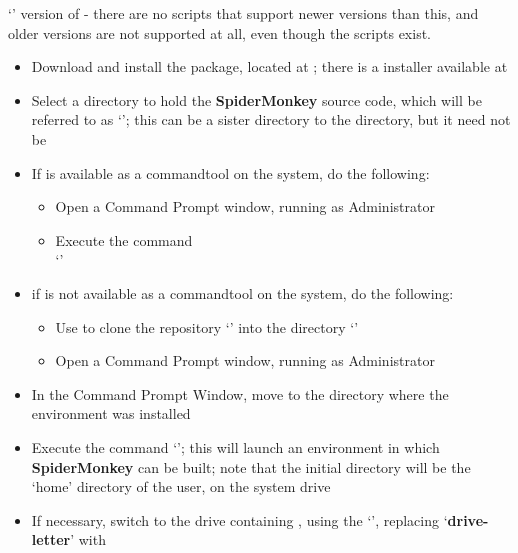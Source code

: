 `' version of  - there are
no scripts that support newer versions than this, and older versions are not supported at
all, even though the scripts exist.
\begin{itemize}
\item Download and install the  package, located at
;
there is a \win{} installer available at\\
\item\exSp{}Select a directory to hold the \textbf{SpiderMonkey} source code, which will
be referred to as `'; this can be a sister directory to the
 directory, but it need not be
\item\exSp{}If  is available as a command\longDash{}tool on the system, do the
following:
\begin{itemize}
\item Open a Command Prompt window, running as Administrator
\item\exSp{}Execute the command\\
`'
\end{itemize}
\item\exSp{}if  is not available as a command\longDash{}tool on the system, do
the following:
\begin{itemize}
\item\exSp{}Use  to clone the repository
`' into the directory
`'
\item\exSp{}Open a Command Prompt window, running as Administrator
\end{itemize}
\item\exSp{}In the Command Prompt Window, move to the directory where the
 environment was installed
\item\exSp{}Execute the command `'; this will launch
an environment in which \textbf{SpiderMonkey} can be built; note that the initial
directory will be the `home' directory of the user, on the system drive
\item\exSp{}If necessary, switch to the drive containing ,
using the `', replacing `\textbf{drive-letter}' with

\end{itemize}
